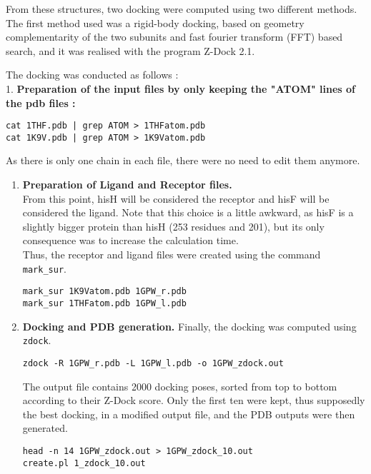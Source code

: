 \documentclass[11pt]{article}
\begin{document}
From these structures, two docking were computed using two different
methods. The first method used was a rigid-body docking, based on
geometry complementarity of the two subunits and fast fourier transform
(FFT) based search, and it was realised with the program Z-Dock 2.1.

The docking was conducted as follows :\\
1. \textbf{Preparation of the input files by only keeping the "ATOM"
lines of the pdb files :}

\begin{verbatim}
cat 1THF.pdb | grep ATOM > 1THFatom.pdb
cat 1K9V.pdb | grep ATOM > 1K9Vatom.pdb
\end{verbatim}

As there is only one chain in each file, there were no need to edit them
anymore.\\

\begin{enumerate}
\def\labelenumi{\arabic{enumi}.}
\setcounter{enumi}{1}
\item
  \textbf{Preparation of Ligand and Receptor files.}\\
  From this point, hisH will be considered the receptor and hisF will be
  considered the ligand. Note that this choice is a little awkward, as
  hisF is a slightly bigger protein than hisH (253 residues and 201),
  but its only consequence was to increase the calculation time.\\
  Thus, the receptor and ligand files were created using the command
  \texttt{mark\_sur}.

\begin{verbatim}
mark_sur 1K9Vatom.pdb 1GPW_r.pdb
mark_sur 1THFatom.pdb 1GPW_l.pdb
\end{verbatim}
\item
  \textbf{Docking and PDB generation.} Finally, the docking was computed
  using \texttt{zdock}.

\begin{verbatim}
zdock -R 1GPW_r.pdb -L 1GPW_l.pdb -o 1GPW_zdock.out
\end{verbatim}

  The output file contains 2000 docking poses, sorted from top to bottom
  according to their Z-Dock score. Only the first ten were kept, thus
  supposedly the best docking, in a modified output file, and the PDB
  outputs were then generated.

\begin{verbatim}
head -n 14 1GPW_zdock.out > 1GPW_zdock_10.out
create.pl 1_zdock_10.out
\end{verbatim}
\end{enumerate}
\end{document}
